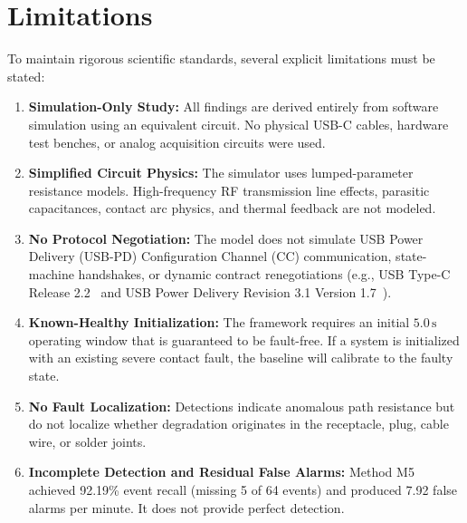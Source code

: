 \documentclass[conference]{IEEEtran}
\begin{document}
\section{Limitations}
To maintain rigorous scientific standards, several explicit limitations must be stated:
\begin{enumerate}
    \item \textbf{Simulation-Only Study:} All findings are derived entirely from software simulation using an equivalent circuit. No physical USB-C cables, hardware test benches, or analog acquisition circuits were used.
    \item \textbf{Simplified Circuit Physics:} The simulator uses lumped-parameter resistance models. High-frequency RF transmission line effects, parasitic capacitances, contact arc physics, and thermal feedback are not modeled.
    \item \textbf{No Protocol Negotiation:} The model does not simulate USB Power Delivery (USB-PD) Configuration Channel (CC) communication, state-machine handshakes, or dynamic contract renegotiations (e.g., USB Type-C Release 2.2~\cite{usbtypec2022} and USB Power Delivery Revision 3.1 Version 1.7~\cite{usbpd2023}).
    \item \textbf{Known-Healthy Initialization:} The framework requires an initial $5.0\,\text{s}$ operating window that is guaranteed to be fault-free. If a system is initialized with an existing severe contact fault, the baseline will calibrate to the faulty state.
    \item \textbf{No Fault Localization:} Detections indicate anomalous path resistance but do not localize whether degradation originates in the receptacle, plug, cable wire, or solder joints.
    \item \textbf{Incomplete Detection and Residual False Alarms:} Method M5 achieved 92.19\% event recall (missing 5 of 64 events) and produced 7.92 false alarms per minute. It does not provide perfect detection.
\end{enumerate}
\end{document}
